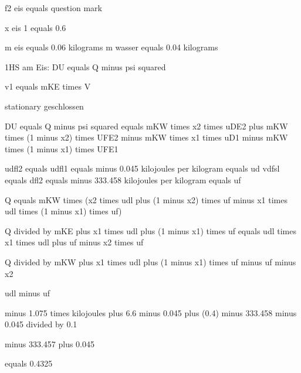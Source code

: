 f2 eis equals question mark

x eis 1 equals 0.6

m eis equals 0.06 kilograms  
m wasser equals 0.04 kilograms

1HS am Eis:  
DU equals Q minus psi squared

v1 equals mKE times V

stationary geschlossen

DU equals Q minus psi squared equals mKW times x2 times uDE2 plus mKW times (1 minus x2) times UFE2  
minus mKW times x1 times uD1 minus mKW times (1 minus x1) times UFE1

udfl2 equals udfl1 equals minus 0.045 kilojoules per kilogram equals ud  
vdfsl equals dfl2 equals minus 333.458 kilojoules per kilogram equals uf

Q equals mKW times (x2 times udl plus (1 minus x2) times uf minus x1 times udl times (1 minus x1) times uf)

Q divided by mKE plus x1 times udl plus (1 minus x1) times uf equals udl times x1 times udl plus uf minus x2 times uf

Q divided by mKW plus x1 times udl plus (1 minus x1) times uf minus uf minus x2

udl minus uf

minus 1.075 times kilojoules plus 6.6 minus 0.045 plus (0.4) minus 333.458 minus 0.045 divided by 0.1

minus 333.457 plus 0.045

equals 0.4325
